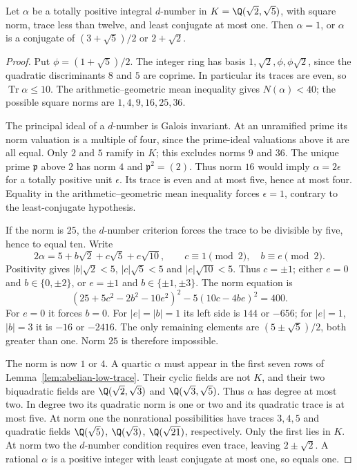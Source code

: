 \begin{lemma}\label{lem:fixed-arithmetic}
Let $\alpha$ be a totally positive integral $d$-number in
$K=\Q(\sqrt2,\sqrt5)$, with square norm, trace less than
twelve, and least conjugate at most one. Then $\alpha=1$, or
$\alpha$ is a conjugate of $(3+\sqrt5)/2$ or $2+\sqrt2$.
\end{lemma}
\begin{proof}
Put $\phi=(1+\sqrt5)/2$. The integer ring has basis
$1,\sqrt2,\phi,\phi\sqrt2$, since the quadratic discriminants
$8$ and $5$ are coprime. In particular its traces are even, so
$\operatorname{Tr}\alpha\le10$. The arithmetic--geometric mean
inequality gives $N(\alpha)<40$; the possible square norms are
$1,4,9,16,25,36$.

The principal ideal of a $d$-number is Galois invariant. At an
unramified prime its norm valuation is a multiple of four, since
the prime-ideal valuations above it are all equal. Only $2$ and $5$
ramify in $K$; this excludes norms $9$ and $36$. The unique prime
$\mathfrak p$ above $2$ has norm $4$ and
$\mathfrak p^2=(2)$. Thus norm $16$ would imply $\alpha=2\epsilon$
for a totally positive unit $\epsilon$. Its trace is even and at
most five, hence at most four. Equality in the arithmetic--geometric
mean inequality forces $\epsilon=1$, contrary to the least-conjugate
hypothesis.

If the norm is $25$, the $d$-number criterion forces the trace to be
divisible by five, hence to equal ten. Write
\[
 2\alpha=5+b\sqrt2+c\sqrt5+e\sqrt{10},\qquad
 c\equiv1\pmod2,\quad b\equiv e\pmod2.
\]
Positivity gives $|b|\sqrt2<5$, $|c|\sqrt5<5$ and
$|e|\sqrt{10}<5$. Thus $c=\pm1$; either $e=0$ and
$b\in\{0,\pm2\}$, or $e=\pm1$ and $b\in\{\pm1,\pm3\}$.
The norm equation is
\[
 (25+5c^2-2b^2-10e^2)^2-5(10c-4be)^2=400.
\]
For $e=0$ it forces $b=0$. For $|e|=|b|=1$ its left side is
$144$ or $-656$; for $|e|=1$, $|b|=3$ it is $-16$ or $-2416$.
The only remaining elements are $(5\pm\sqrt5)/2$, both greater
than one. Norm $25$ is therefore impossible.

The norm is now $1$ or $4$. A quartic $\alpha$ must appear in the
first seven rows of Lemma~\ref{lem:abelian-low-trace}. Their cyclic
fields are not $K$, and their two biquadratic fields are
$\Q(\sqrt2,\sqrt3)$ and $\Q(\sqrt3,\sqrt5)$.
Thus $\alpha$ has degree at most two. In degree two its quadratic
norm is one or two and its quadratic trace is at most five. At norm
one the nonrational possibilities have traces $3,4,5$ and quadratic
fields $\Q(\sqrt5)$, $\Q(\sqrt3)$,
$\Q(\sqrt{21})$, respectively. Only the first lies in $K$.
At norm two the $d$-number condition requires even trace, leaving
$2\pm\sqrt2$. A rational $\alpha$ is a positive integer with least
conjugate at most one, so equals one.
\end{proof}

